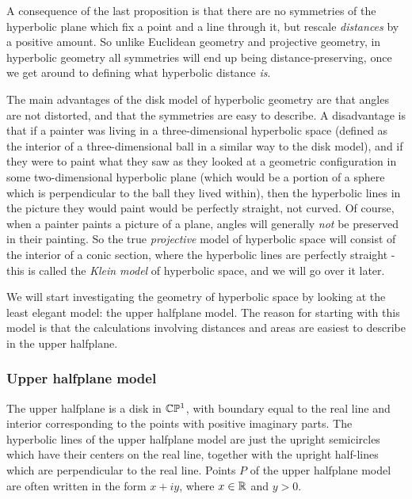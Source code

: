 A consequence of the last proposition is that there are no symmetries of the hyperbolic plane which fix a point and a line through it, but rescale \emph{distances} by a positive amount. So unlike Euclidean geometry and projective geometry, in hyperbolic geometry all symmetries will end up being distance-preserving, once we get around to defining what hyperbolic distance \emph{is}.

The main advantages of the disk model of hyperbolic geometry are that angles are not distorted, and that the symmetries are easy to describe. A disadvantage is that if a painter was living in a three-dimensional hyperbolic space (defined as the interior of a three-dimensional ball in a similar way to the disk model), and if they were to paint what they saw as they looked at a geometric configuration in some two-dimensional hyperbolic plane (which would be a portion of a sphere which is perpendicular to the ball they lived within), then the hyperbolic lines in the picture they would paint would be perfectly straight, not curved. Of course, when a painter paints a picture of a plane, angles will generally \emph{not} be preserved in their painting. So the true \emph{projective} model of hyperbolic space will consist of the interior of a conic section, where the hyperbolic lines are perfectly straight - this is called the \emph{Klein model} of hyperbolic space, and we will go over it later.

We will start investigating the geometry of hyperbolic space by looking at the least elegant model: the upper halfplane model. The reason for starting with this model is that the calculations involving distances and areas are easiest to describe in the upper halfplane.


\subsubsection{Upper halfplane model}

The upper halfplane is a disk in $\mathbb{C}\mathbb{P}^1$, with boundary equal to the real line and interior corresponding to the points with positive imaginary parts. The hyperbolic lines of the upper halfplane model are just the upright semicircles which have their centers on the real line, together with the upright half-lines which are perpendicular to the real line. Points $P$ of the upper halfplane model are often written in the form $x + iy$, where $x \in \mathbb{R}$ and $y > 0$.

